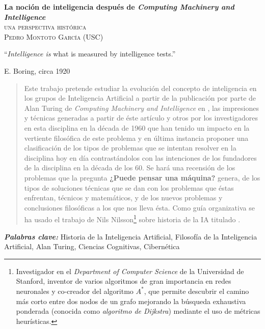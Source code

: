 \documentclass[12pt]{memoir}
\makeatletter
\newlength\drop
\newcommand*\titleM{\begingroup%
\setlength\drop{0.08\textheight}
\centering
\vspace*{\drop}
{\Huge\bfseries La noción de inteligencia después de \textit{Computing Machinery and Intelligence}}\\[\baselineskip]
{\scshape una perspectiva histórica}\\[\baselineskip]
\vfill
{\large\scshape Pedro Montoto García (USC)}\par
\vfill
{\scshape \@date}\par
\vspace*{2\drop}
\endgroup}
\providecommand{\keywords}[2]{
	\textbf{\textit{#1: }} #2
}
\makeatother
\begin{document}
\pagestyle{empty}




\begin{titlingpage}
\titleM
\end{titlingpage}



\setlength{\epigraphwidth}{0.8\textwidth}
\thispagestyle{empty}
\epigraph{``\textit{Intelligence is} what is measured by intelligence tests.''}{E. Boring, circa 1920}
\newpage


\thispagestyle{empty}
\begin{abstract}
	Este trabajo pretende estudiar la evolución del concepto de inteligencia en los grupos de Inteligencia Artificial a partir de la publicación por parte de Alan Turing de \textit{Computing Machinery and Intelligence} en \cite{Turing1950cmi}, las impresiones y técnicas generadas a partir de éste artículo y otros por los investigadores en esta disciplina en la década de 1960 que han tenido un impacto en la vertiente filosófica de este problema y en última instancia proponer una clasificación de los tipos de problemas que se intentan resolver en la disciplina hoy en día contrastándolos con las intenciones de los fundadores de la disciplina en la década de los 60. Se hará una recensión de los problemas que la pregunta \textbf{¿Puede pensar una máquina?} genera, de los tipos de soluciones técnicas que se dan con los problemas que éstas enfrentan, técnicos y matemáticos, y de los nuevos problemas y conclusiones filosóficas a los que nos lleva ésta. Como guía organizativa se ha usado el trabajo de Nils Nilsson\footnote{Investigador en el \textit{Department of Computer Science} de la Universidad de Stanford, inventor de varios algoritmos de gran importancia en redes neuronales y co-creador del algoritmo $A^*$, que permite descubrir el camino más corto entre dos nodos de un grafo mejorando la búsqueda exhaustiva ponderada (conocida como \textit{algoritmo de Dijkstra}) mediante el uso de métricas heurísticas.} \parencite{Nilsson2009} sobre historia de la IA titulado .
\end{abstract}

\keywords{Palabras clave}{Historia de la Inteligencia Artificial, Filosofía de la Inteligencia Artificial, Alan Turing, Ciencias Cognitivas, Cibernética}
\end{document}
